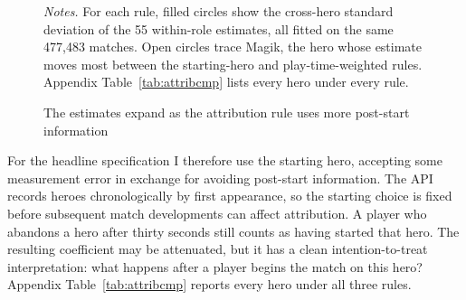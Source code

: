 \documentclass[11pt]{article}
\begin{document}
\begin{figure}[!htb]\centering
\caption{The estimates expand as the attribution rule uses more post-start information}
\label{fig:ladder}
\vspace{2pt}

\begin{minipage}{0.92\linewidth}\footnotesize\vspace{4pt}
\emph{Notes.} For each rule, filled circles show the cross-hero standard deviation of the 55
within-role estimates, all fitted on the same 477,483 matches. Open circles trace
Magik, the hero whose estimate moves most between the starting-hero and
play-time-weighted rules. Appendix Table~\ref{tab:attribcmp} lists every hero under every rule.
\end{minipage}
\end{figure}

For the headline specification I therefore use the starting hero, accepting some measurement
error in exchange for avoiding post-start information. The API records heroes chronologically by
first appearance, so the starting choice is fixed before subsequent match developments can affect
attribution. A player who abandons a hero after thirty seconds still counts as having started that
hero. The resulting coefficient may be attenuated, but it has a clean intention-to-treat
interpretation: what happens after a player begins the match on this hero? Appendix
Table~\ref{tab:attribcmp} reports every hero under all three rules.
\end{document}
